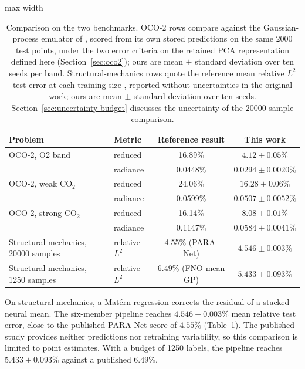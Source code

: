 \documentclass[twoside,11pt]{article}
\newcommand{\errSix}{4.546}          %
\newcommand{\errSixSd}{0.003}
\newcommand{\errBestLow}{5.433}      %
\newcommand{\errBestLowSd}{0.093}    %
\newcommand{\pubBestHi}{4.55}        %
\newcommand{\pubBestLo}{6.49}        %
\begin{document}
\begin{table}[t]
\centering

\begin{adjustbox}{max width=\linewidth}
\begin{tabular}{llcc}
\toprule
Problem & Metric & Reference result & This work \\
\midrule
OCO-2, O2 band & reduced & 16.89\% & $4.12\pm0.05\%$ \\
 & radiance & 0.0448\% & $0.0294\pm0.0020\%$ \\
OCO-2, weak CO$_2$ & reduced & 24.06\% & $16.28\pm0.06\%$ \\
 & radiance & 0.0599\% & $0.0507\pm0.0052\%$ \\
OCO-2, strong CO$_2$ & reduced & 16.14\% & $8.08\pm0.01\%$ \\
 & radiance & 0.1147\% & $0.0584\pm0.0041\%$ \\
\midrule
Structural mechanics, 20000 samples & relative $L^2$ & \pubBestHi\% (PARA-Net) & $\errSix\pm\errSixSd\%$ \\
Structural mechanics, 1250 samples & relative $L^2$ & \pubBestLo\% (FNO-mean GP) & $\errBestLow\pm\errBestLowSd\%$ \\
\bottomrule
\end{tabular}
\end{adjustbox}
\caption{Comparison on the two benchmarks. OCO-2 rows compare against the
Gaussian-process emulator of \citet{susiluoto2025radiative}, scored from its
own stored predictions on the same $2000$ test points, under the two error criteria on the retained PCA representation defined here (Section~\ref{sec:oco2}); ours are mean $\pm$ standard
deviation over ten seeds per band. Structural-mechanics rows quote the
reference mean relative $L^2$ test error at each training size
\citep{dehoop2022cost,mora2025operator}, reported without uncertainties in
the original work; ours are mean $\pm$ standard deviation over ten seeds.
Section~\ref{sec:uncertainty-budget} discusses the uncertainty of the 20000-sample comparison.}
\label{tab:twoproblems}
\end{table}

On structural mechanics, a Mat\'ern regression corrects the residual of a stacked neural mean. The six-member pipeline reaches $\errSix\pm\errSixSd\%$ mean relative test error, close to the published PARA-Net score of $\pubBestHi\%$ (Table~\ref{tab:twoproblems}). The published study provides neither predictions nor retraining variability, so this comparison is limited to point estimates. With a budget of 1250 labels, the pipeline reaches $\errBestLow\pm\errBestLowSd\%$ against a published $\pubBestLo\%$.
\end{document}

